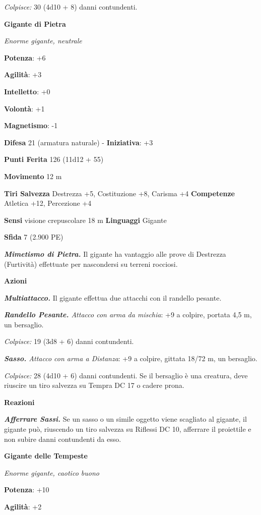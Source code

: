 \begin{multicols}{2}
\emph{Colpisce:} 30 (4d10 + 8) danni contundenti.

\textbf{Gigante di Pietra}

\emph{Enorme gigante, neutrale}

\textbf{Potenza}: +6

\textbf{Agilità}: +3

\textbf{Intelletto}: +0

\textbf{Volontà}: +1

\textbf{Magnetismo}: -1

\textbf{Difesa} 21 (armatura naturale) - \textbf{Iniziativa}: +3

\textbf{Punti Ferita} 126 (11d12 + 55)

\textbf{Movimento} 12 m

\textbf{Tiri Salvezza} Destrezza +5, Costituzione +8, Carisma +4
\textbf{Competenze} Atletica +12, Percezione +4

\textbf{Sensi} visione crepuscolare 18 m
\textbf{Linguaggi} Gigante

\textbf{Sfida} 7 (2.900 PE)

\emph{\textbf{Mimetismo di Pietra.}} Il gigante ha vantaggio alle prove
di Destrezza (Furtività) effettuate per nascondersi su terreni rocciosi.

\textbf{Azioni}

\emph{\textbf{Multiattacco.}} Il gigante effettua due attacchi con il
randello pesante.

\emph{\textbf{Randello Pesante.} Attacco con arma da mischia}: +9 a
colpire, portata 4,5 m, un bersaglio.

\emph{Colpisce:} 19 (3d8 + 6) danni contundenti.

\emph{\textbf{Sasso.} Attacco con arma a Distanza}: +9 a colpire,
gittata 18/72 m, un bersaglio.

\emph{Colpisce:} 28 (4d10 + 6) danni contundenti. Se il bersaglio è una
creatura, deve riuscire un tiro salvezza su Tempra DC 17 o cadere prona.

\textbf{Reazioni}

\emph{\textbf{Afferrare Sassi.}} Se un sasso o un simile oggetto viene
scagliato al gigante, il gigante può, riuscendo un tiro salvezza su Riflessi DC 10, afferrare il proiettile e non subire danni contundenti
da esso.

\textbf{Gigante delle Tempeste}

\emph{Enorme gigante, caotico buono}

\textbf{Potenza}: +10

\textbf{Agilità}: +2


\end{multicols}
